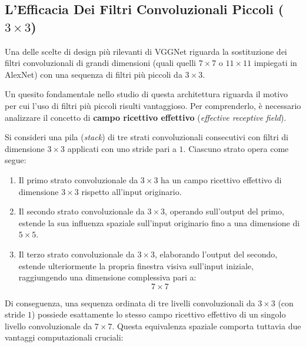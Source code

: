 ﻿\documentclass[11pt, a4paper]{article}
\begin{document}

\subsection{L'Efficacia Dei Filtri Convoluzionali Piccoli ($3 \times 3$)}

Una delle scelte di design più rilevanti di VGGNet riguarda la sostituzione dei filtri convoluzionali di grandi dimensioni (quali quelli $7 \times 7$ o $11 \times 11$ impiegati in AlexNet) con una sequenza di filtri più piccoli da $3 \times 3$.

Un quesito fondamentale nello studio di questa architettura riguarda il motivo per cui l'uso di filtri più piccoli risulti vantaggioso. Per comprenderlo, è necessario analizzare il concetto di \textbf{campo ricettivo effettivo} (\emph{effective receptive field}).

Si consideri una pila (\emph{stack}) di tre strati convoluzionali consecutivi con filtri di dimensione $3 \times 3$ applicati con uno stride pari a $1$. Ciascuno strato opera come segue:
\begin{enumerate}
    \item Il primo strato convoluzionale da $3 \times 3$ ha un campo ricettivo effettivo di dimensione $3 \times 3$ rispetto all'input originario.
    \item Il secondo strato convoluzionale da $3 \times 3$, operando sull'output del primo, estende la sua influenza spaziale sull'input originario fino a una dimensione di $5 \times 5$.
    \item Il terzo strato convoluzionale da $3 \times 3$, elaborando l'output del secondo, estende ulteriormente la propria finestra visiva sull'input iniziale, raggiungendo una dimensione complessiva pari a:
    \[
    \boxed{7 \times 7}
    \]
\end{enumerate}

Di conseguenza, una sequenza ordinata di tre livelli convoluzionali da $3 \times 3$ (con stride $1$) possiede esattamente lo stesso campo ricettivo effettivo di un singolo livello convoluzionale da $7 \times 7$. Questa equivalenza spaziale comporta tuttavia due vantaggi computazionali cruciali:
\end{document}
